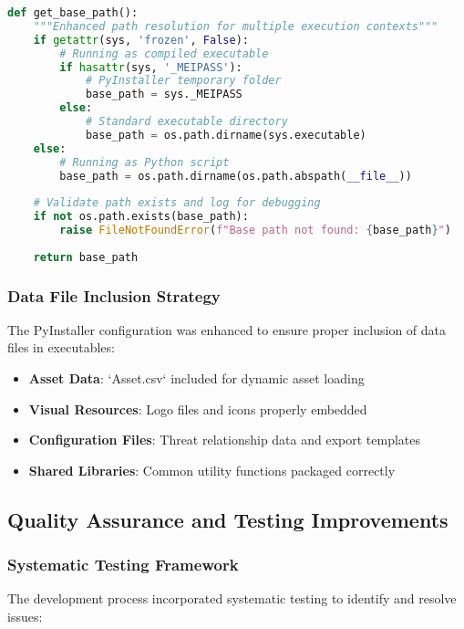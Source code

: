 \documentclass[binding=0.6cm]{sapthesis}
\begin{document}
\begin{lstlisting}[language=Python, caption=Robust Path Resolution Implementation]
def get_base_path():
    """Enhanced path resolution for multiple execution contexts"""
    if getattr(sys, 'frozen', False):
        # Running as compiled executable
        if hasattr(sys, '_MEIPASS'):
            # PyInstaller temporary folder
            base_path = sys._MEIPASS
        else:
            # Standard executable directory
            base_path = os.path.dirname(sys.executable)
    else:
        # Running as Python script
        base_path = os.path.dirname(os.path.abspath(__file__))
    
    # Validate path exists and log for debugging
    if not os.path.exists(base_path):
        raise FileNotFoundError(f"Base path not found: {base_path}")
    
    return base_path
\end{lstlisting}

\subsubsection{Data File Inclusion Strategy}

The PyInstaller configuration was enhanced to ensure proper inclusion of data files in executables:

\begin{itemize}
    \item \textbf{Asset Data}: `Asset.csv` included for dynamic asset loading
    \item \textbf{Visual Resources}: Logo files and icons properly embedded
    \item \textbf{Configuration Files}: Threat relationship data and export templates
    \item \textbf{Shared Libraries}: Common utility functions packaged correctly
\end{itemize}

\subsection{Quality Assurance and Testing Improvements}

\subsubsection{Systematic Testing Framework}

The development process incorporated systematic testing to identify and resolve issues:
\end{document}
